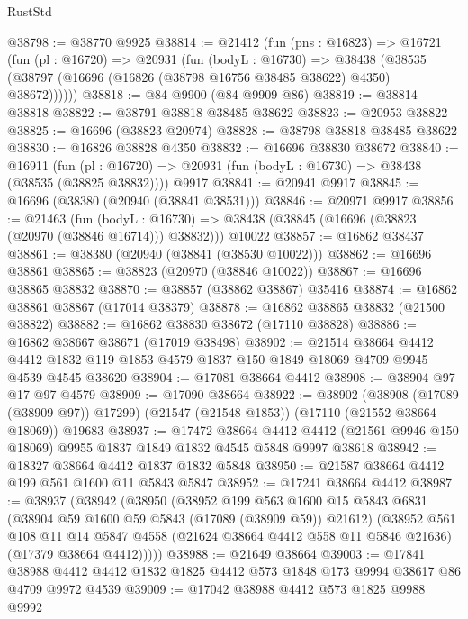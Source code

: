 \begin{lexlean}{RustStd}
\begin{coremodule}
@38798 := @38770 @9925
@38814 := @21412
    (fun (pns : @16823) =>
    @16721
      (fun (pl : @16720) =>
      @20931
        (fun (bodyL : @16730) =>
        @38438 (@38535 (@38797 (@16696 (@16826 (@38798 @16756 @38485 @38622) @4350) @38672))))))
@38818 := @84 @9900 (@84 @9909 @86)
@38819 := @38814 @38818
@38822 := @38791 @38818 @38485 @38622
@38823 := @20953 @38822
@38825 := @16696 (@38823 @20974)
@38828 := @38798 @38818 @38485 @38622
@38830 := @16826 @38828 @4350
@38832 := @16696 @38830 @38672
@38840 := @16911
    (fun (pl : @16720) => @20931 (fun (bodyL : @16730) => @38438 (@38535 (@38825 @38832))))
    @9917
@38841 := @20941 @9917
@38845 := @16696 (@38380 (@20940 (@38841 @38531)))
@38846 := @20971 @9917
@38856 := @21463
    (fun (bodyL : @16730) => @38438 (@38845 (@16696 (@38823 (@20970 (@38846 @16714))) @38832)))
    @10022
@38857 := @16862 @38437
@38861 := @38380 (@20940 (@38841 (@38530 @10022)))
@38862 := @16696 @38861
@38865 := @38823 (@20970 (@38846 @10022))
@38867 := @16696 @38865 @38832
@38870 := @38857 (@38862 @38867) @35416
@38874 := @16862 @38861 @38867 (@17014 @38379)
@38878 := @16862 @38865 @38832 (@21500 @38822)
@38882 := @16862 @38830 @38672 (@17110 @38828)
@38886 := @16862 @38667 @38671 (@17019 @38498)
@38902 := @21514
    @38664
    @4412
    @4412
    @1832
    @119
    @1853
    @4579
    @1837
    @150
    @1849
    @18069
    @4709
    @9945
    @4539
    @4545
    @38620
@38904 := @17081 @38664 @4412
@38908 := @38904 @97 @17 @97 @4579
@38909 := @17090 @38664
@38922 := @38902
    (@38908 (@17089 (@38909 @97)) @17299)
    (@21547 (@21548 @1853))
    (@17110 (@21552 @38664 @18069))
    @19683
@38937 := @17472
    @38664
    @4412
    @4412
    (@21561 @9946 @150 @18069)
    @9955
    @1837
    @1849
    @1832
    @4545
    @5848
    @9997
    @38618
@38942 := @18327 @38664 @4412 @1837 @1832 @5848
@38950 := @21587 @38664 @4412 @199 @561 @1600 @11 @5843 @5847
@38952 := @17241 @38664 @4412
@38987 := @38937
    (@38942
      (@38950
        (@38952
          @199
          @563
          @1600
          @15
          @5843
          @6831
          (@38904 @59 @1600 @59 @5843 (@17089 (@38909 @59)) @21612)
          (@38952
            @561
            @108
            @11
            @14
            @5847
            @4558
            (@21624 @38664 @4412 @558 @11 @5846 @21636)
            (@17379 @38664 @4412)))))
@38988 := @21649 @38664
@39003 := @17841
    @38988
    @4412
    @4412
    @1832
    @1825
    @4412
    @573
    @1848
    @173
    @9994
    @38617
    @86
    @4709
    @9972
    @4539
@39009 := @17042 @38988 @4412 @573 @1825 @9988 @9992

\end{coremodule}
\end{lexlean}
